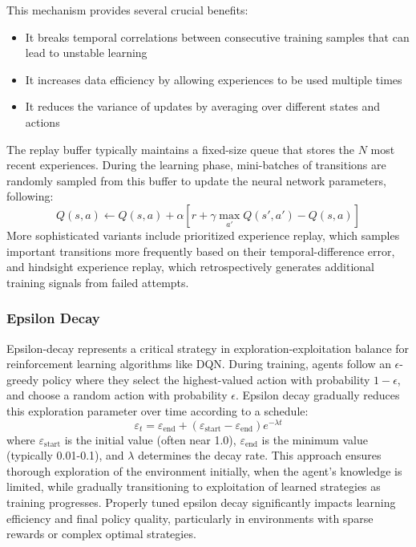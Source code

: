 This mechanism provides several crucial benefits:
\begin{itemize}
    \item It breaks temporal correlations between consecutive training samples that can lead to unstable learning
    \item It increases data efficiency by allowing experiences to be used multiple times
    \item It reduces the variance of updates by averaging over different states and actions
\end{itemize}
The replay buffer typically maintains a fixed-size queue that stores the $N$ most recent experiences. 
During the learning phase, mini-batches of transitions are randomly sampled from this buffer to update the neural network parameters, following:
$$Q(s,a) \leftarrow Q(s,a) + \alpha[r + \gamma\max_{a'}Q(s',a') - Q(s,a)]$$
More sophisticated variants include prioritized experience replay, which samples important transitions more frequently based on their temporal-difference error, 
and hindsight experience replay, which retrospectively generates additional training signals from failed attempts.


\subsubsection{Epsilon Decay}

Epsilon-decay represents a critical strategy in exploration-exploitation balance for reinforcement learning algorithms like DQN. 
During training, agents follow an $\epsilon$-greedy policy where they select the highest-valued action with probability $1-\epsilon$, and choose a random action with probability $\epsilon$.
Epsilon decay gradually reduces this exploration parameter over time according to a schedule:
$$\varepsilon_t = \varepsilon_{\text{end}} + (\varepsilon_{\text{start}} - \varepsilon_{\text{end}})e^{-\lambda t}$$
where $\varepsilon_{\text{start}}$ is the initial value (often near 1.0), $\varepsilon_{\text{end}}$ is the minimum value (typically 0.01-0.1), and $\lambda$ determines the decay rate.
This approach ensures thorough exploration of the environment initially, when the agent's knowledge is limited, while gradually transitioning to exploitation of learned strategies as training progresses. 
Properly tuned epsilon decay significantly impacts learning efficiency and final policy quality, particularly in environments with sparse rewards or complex optimal strategies.